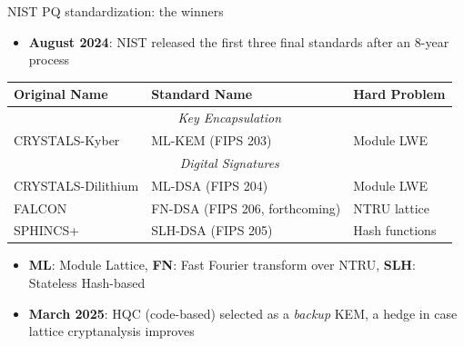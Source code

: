 \ifdefined\PRESENTATION\else\PassOptionsToClass{handout}{beamer}\fi\documentclass[aspectratio=169, lualatex]{beamer}
\begin{document}
\begin{frame}{NIST PQ standardization: the winners}
	\begin{itemize}
		\item \textbf{August 2024}: NIST released the first three final standards after an 8-year process
	\end{itemize}

	\begin{center}
		\begin{tabular}{|l|l|l|}
			\hline
			\textbf{Original Name} & \textbf{Standard Name}         & \textbf{Hard Problem} \\
			\hline
			\hline
			\multicolumn{3}{|c|}{\textit{Key Encapsulation}}                                \\
			\hline
			CRYSTALS-Kyber         & ML-KEM (FIPS 203)              & Module LWE            \\
			\hline
			\hline
			\multicolumn{3}{|c|}{\textit{Digital Signatures}}                               \\
			\hline
			CRYSTALS-Dilithium     & ML-DSA (FIPS 204)              & Module LWE            \\
			FALCON                 & FN-DSA (FIPS 206, forthcoming) & NTRU lattice          \\
			SPHINCS+               & SLH-DSA (FIPS 205)             & Hash functions        \\
			\hline
		\end{tabular}
	\end{center}

	\begin{itemize}
		\item \textbf{ML}: Module Lattice, \textbf{FN}: Fast Fourier transform over NTRU, \textbf{SLH}: Stateless Hash-based
		\item \textbf{March 2025}: HQC (code-based) selected as a \textit{backup} KEM, a hedge in case lattice cryptanalysis improves
	\end{itemize}
\end{frame}
\end{document}
